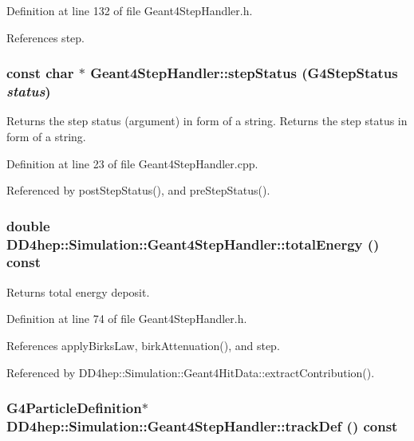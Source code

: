 Definition at line 132 of file Geant4StepHandler.h.

References step.\hypertarget{class_d_d4hep_1_1_simulation_1_1_geant4_step_handler_a749fffe231a34f253d498edf989ae035}{
\subsubsection[{stepStatus}]{\setlength{\rightskip}{0pt plus 5cm}const char $\ast$ Geant4StepHandler::stepStatus (G4StepStatus {\em status})}}
\label{class_d_d4hep_1_1_simulation_1_1_geant4_step_handler_a749fffe231a34f253d498edf989ae035}


Returns the step status (argument) in form of a string. Returns the step status in form of a string. 

Definition at line 23 of file Geant4StepHandler.cpp.

Referenced by postStepStatus(), and preStepStatus().\hypertarget{class_d_d4hep_1_1_simulation_1_1_geant4_step_handler_addaa9eb154cfccd6500e81a47fb637b0}{
\subsubsection[{totalEnergy}]{\setlength{\rightskip}{0pt plus 5cm}double DD4hep::Simulation::Geant4StepHandler::totalEnergy () const}}
\label{class_d_d4hep_1_1_simulation_1_1_geant4_step_handler_addaa9eb154cfccd6500e81a47fb637b0}


Returns total energy deposit. 

Definition at line 74 of file Geant4StepHandler.h.

References applyBirksLaw, birkAttenuation(), and step.

Referenced by DD4hep::Simulation::Geant4HitData::extractContribution().\hypertarget{class_d_d4hep_1_1_simulation_1_1_geant4_step_handler_a68f835da79e638dc11306c417bc9495b}{
\subsubsection[{trackDef}]{\setlength{\rightskip}{0pt plus 5cm}G4ParticleDefinition$\ast$ DD4hep::Simulation::Geant4StepHandler::trackDef () const}}
\label{class_d_d4hep_1_1_simulation_1_1_geant4_step_handler_a68f835da79e638dc11306c417bc9495b}


